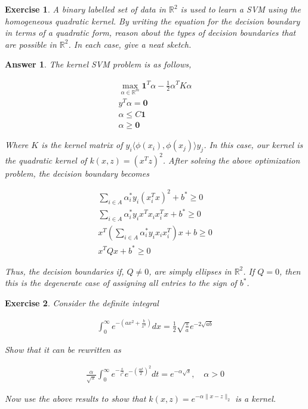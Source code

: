 \documentclass[12pt]{article}
\theoremstyle{colon}
\newtheorem{exercise}{Exercise}
\newtheorem*{answer}{Answer}
\begin{document}
\clearpage

\begin{exercise}
  A binary labelled set of data in $\mathbb{R}^2$ is used to learn a SVM using the homogeneous quadratic kernel. By writing the equation for the decision boundary in terms of a quadratic form, reason about the types of decision boundaries that are possible in $\mathbb{R}^2$. In each case, give a neat sketch.
\end{exercise}

\begin{answer}
  The kernel SVM problem is as follows,

  \begin{gather*}
    \max_{\alpha \in \mathbb{R}^m} \bm{1}^T \alpha - \frac{1}{2} \alpha^T K \alpha \\
    y^T \alpha = \bm{0} \\
    \alpha \leq C \bm{1} \\
    \alpha \geq \bm{0}
  \end{gather*}

  Where $K$ is the kernel matrix of $y_i \langle \phi(x_i), \phi(x_j) \rangle y_j$. In this case, our kernel is the quadratic kernel of $k(x,z) = (x^T z)^2$. After solving the above optimization problem, the decision boundary becomes

  \begin{gather*}
    \sum_{i \in A} \alpha_i^* y_i (x_i^T x)^2 + b^* \geq 0 \\
    \sum_{i \in A} \alpha_i^* y_i x^T x_i x_i^T x + b^* \geq 0 \\
    x^T \left( \sum_{i \in A} \alpha_i^* y_i x_i x_i^T \right) x + b \geq 0 \\
    x^T Q x + b^* \geq 0
  \end{gather*}

  Thus, the decision boundaries if, $Q \neq 0$, are simply ellipses in $\mathbb{R}^2$. If $Q = 0$, then this is the degenerate case of assigning all entries to the sign of $b^*$.
\end{answer}

\clearpage

\begin{exercise}
  Consider the definite integral

  \begin{gather*}
    \int_0^\infty e^{-(ax^2 + \frac{b}{x^2})} dx = \frac{1}{2} \sqrt{\frac{\pi}{a}} e^{-2 \sqrt{ab}}
  \end{gather*}

  Show that it can be rewritten as

  \begin{gather*}
    \frac{\alpha}{\sqrt{\pi}} \int_0^\infty e^{-\frac{s}{t^2}} e^{-(\frac{\alpha t}{2})^2} dt = e^{-\alpha \sqrt{s}}, \quad \alpha > 0
  \end{gather*}

  Now use the above results to show that $k(x,z) = e^{-\alpha \lVert x - z \rVert_2}$ is a kernel.
\end{exercise}
\end{document}
